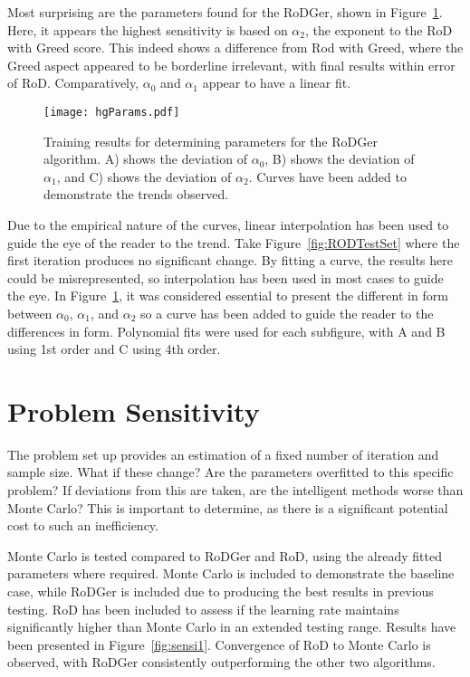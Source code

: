 Most surprising are the parameters found for the RoDGer, shown in Figure~\ref{fig:paramHg}. Here, it appears the highest sensitivity is based on $\alpha_2$, the exponent to the RoD with Greed score. This indeed shows a difference from Rod with Greed, where the Greed aspect appeared to be borderline irrelevant, with final results within error of RoD. Comparatively, $\alpha_0$ and $\alpha_1$ appear to have a linear fit.

\begin{figure}[H]
    \begin{center}
        \texttt{[image: hgParams.pdf]}
        \caption[Non-parametric comparison]{Training results for determining parameters for the RoDGer algorithm. A) shows the deviation of $\alpha_0$, B) shows the deviation of $\alpha_1$, and C) shows the deviation of $\alpha_2$. Curves have been added to demonstrate the trends observed.}
        \label{fig:paramHg}
    \end{center}
\end{figure}

Due to the empirical nature of the curves, linear interpolation has been used to guide the eye of the reader to the trend. Take Figure~\ref{fig:RODTestSet} where the first iteration produces no significant change. By fitting a curve, the results here could be misrepresented, so interpolation has been used in most cases to guide the eye. In Figure~\ref{fig:paramHg}, it was considered essential to present the different in form between ${\alpha_0}$, ${\alpha_1}$, and ${\alpha_2}$ so a curve has been added to guide the reader to the differences in form. Polynomial fits were used for each subfigure, with A and B using 1st order and C using 4th order.

\section{Problem Sensitivity}
The problem set up provides an estimation of a fixed number of iteration and sample size. What if these change? Are the parameters overfitted to this specific problem? If deviations from this are taken, are the intelligent methods worse than Monte Carlo? This is important to determine, as there is a significant potential cost to such an inefficiency.

Monte Carlo is tested compared to RoDGer and RoD, using the already fitted parameters where required. Monte Carlo is included to demonstrate the baseline case, while RoDGer is included due to producing the best results in previous testing. RoD has been included to assess if the learning rate maintains significantly higher than Monte Carlo in an extended testing range. Results have been presented in Figure~\ref{fig:sensi1}. Convergence of RoD to Monte Carlo is observed, with RoDGer consistently outperforming the other two algorithms.

